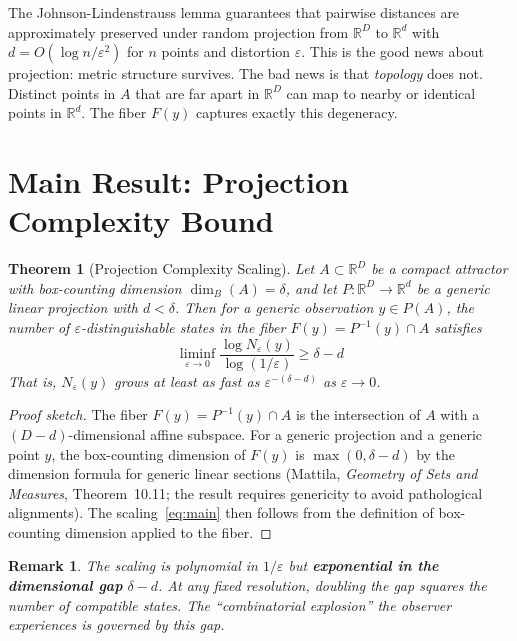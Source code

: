 \documentclass[12pt,a4paper]{article}
\newtheorem{theorem}{Theorem}
\newtheorem{remark}{Remark}
\begin{document}
The Johnson-Lindenstrauss lemma \citep{johnson1984} guarantees that pairwise distances are approximately preserved under random projection from $\mathbb{R}^D$ to $\mathbb{R}^d$ with $d = O(\log n / \varepsilon^2)$ for $n$ points and distortion $\varepsilon$.
This is the good news about projection: metric structure survives.
The bad news is that \emph{topology} does not.
Distinct points in $A$ that are far apart in $\mathbb{R}^D$ can map to nearby or identical points in $\mathbb{R}^d$.
The fiber $F(y)$ captures exactly this degeneracy.


\section{Main Result: Projection Complexity Bound}
\label{sec:main}

\begin{theorem}[Projection Complexity Scaling]
\label{thm:main}
Let $A \subset \mathbb{R}^D$ be a compact attractor with box-counting dimension $\dim_B(A) = \delta$, and let $P: \mathbb{R}^D \to \mathbb{R}^d$ be a generic linear projection with $d < \delta$.
Then for a generic observation $y \in P(A)$, the number of $\varepsilon$-distinguishable states in the fiber $F(y) = P^{-1}(y) \cap A$ satisfies
\begin{equation}
\liminf_{\varepsilon \to 0} \frac{\log N_\varepsilon(y)}{\log(1/\varepsilon)} \geq \delta - d
\label{eq:main}
\end{equation}
That is, $N_\varepsilon(y)$ grows at least as fast as $\varepsilon^{-(\delta - d)}$ as $\varepsilon \to 0$.
\end{theorem}

\begin{proof}[Proof sketch]
The fiber $F(y) = P^{-1}(y) \cap A$ is the intersection of $A$ with a $(D-d)$-dimensional affine subspace.
For a generic projection and a generic point $y$, the box-counting dimension of $F(y)$ is $\max(0, \delta - d)$ by the dimension formula for generic linear sections (Mattila, \emph{Geometry of Sets and Measures}, Theorem~10.11; the result requires genericity to avoid pathological alignments).
The scaling~\eqref{eq:main} then follows from the definition of box-counting dimension applied to the fiber.
\end{proof}

\begin{remark}
The scaling is polynomial in $1/\varepsilon$ but \textbf{exponential in the dimensional gap} $\delta - d$.
At any fixed resolution, doubling the gap squares the number of compatible states.
The ``combinatorial explosion'' the observer experiences is governed by this gap.
\end{remark}
\end{document}
